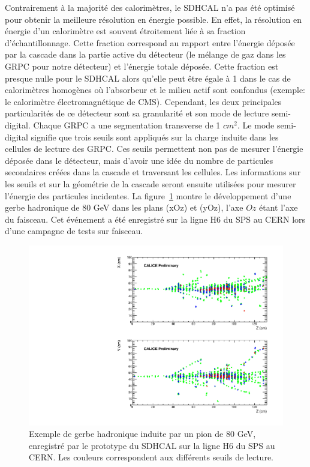 %
Contrairement à la majorité des calorimètres, le SDHCAL n'a pas été optimisé pour obtenir la meilleure résolution en énergie possible. En effet, la résolution en énergie d'un calorimètre est souvent étroitement liée à sa fraction d’échantillonnage. Cette fraction correspond au rapport entre l'énergie déposée par la cascade dans la partie active du détecteur (le mélange de gaz dans les GRPC pour notre détecteur) et l'énergie totale déposée. Cette fraction est presque nulle pour le SDHCAL alors qu'elle peut être égale à 1 dans le cas de calorimètres homogènes où l'absorbeur et le milieu actif sont confondus (exemple: le calorimètre électromagnétique de CMS). Cependant, les deux principales particularités de ce détecteur sont sa granularité et son mode de lecture semi-digital. Chaque GRPC a une segmentation transverse de 1 $cm^2$. Le mode semi-digital signifie que trois seuils sont appliqués sur la charge induite dans les cellules de lecture des GRPC. Ces seuils permettent non pas de mesurer l’énergie déposée dans le détecteur, mais d'avoir une idée du nombre de particules secondaires créées dans la cascade et traversant les cellules. Les informations sur les seuils et sur la géométrie de la cascade seront ensuite utilisées pour mesurer l'énergie des particules incidentes. La figure~\ref{fig:shower80} montre le développement d'une gerbe hadronique de 80 GeV dans les plans (xOz) et (yOz), l'axe $Oz$ étant l'axe du faisceau. Cet événement a été enregistré sur la ligne H6 du SPS au CERN lors d'une campagne de tests sur faisceau.
\begin{figure}[!ht]
  \begin{center}
    \includegraphics[width=.8\textwidth]{SDHCAL/figs/pion80GeV.pdf}
    \caption{Exemple de gerbe hadronique induite par un pion de 80 GeV, enregistré par le prototype du SDHCAL sur la ligne H6 du SPS au CERN. Les couleurs correspondent aux différents seuils de lecture.}
    \label{fig:shower80}
  \end{center}
\end{figure}
